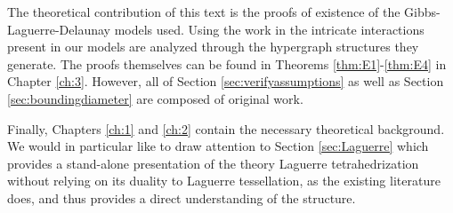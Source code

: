 The theoretical contribution of this text is the proofs of existence of the Gibbs-Laguerre-Delaunay models used. Using the work in \cite{DDG12} the intricate interactions present in our models are analyzed through the hypergraph structures they generate. The proofs themselves can be found in Theorems \ref{thm:E1}-\ref{thm:E4} in Chapter \ref{ch:3}. However, all of Section \ref{sec:verifyassumptions} as well as Section \ref{sec:boundingdiameter} are composed of original work. 

Finally, Chapters \ref{ch:1} and \ref{ch:2} contain the necessary theoretical background. We would in particular like to draw attention to Section \ref{sec:Laguerre} which provides a stand-alone presentation of the theory Laguerre tetrahedrization without relying on its duality to Laguerre tessellation, as the existing literature does, and thus provides a direct understanding of the structure. 


